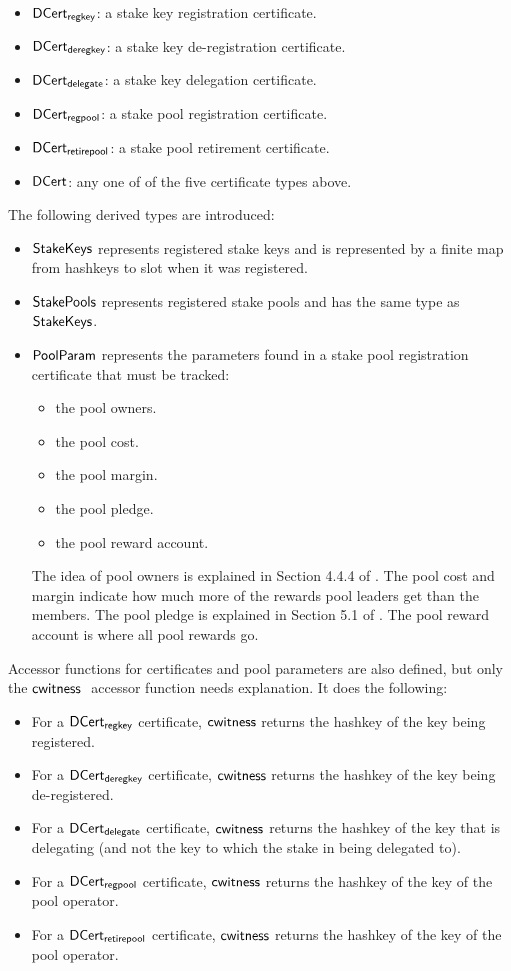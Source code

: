 \begin{itemize}
\item $\mathsf{DCert_{regkey}}$: a stake key registration certificate.
\item $\mathsf{DCert_{deregkey}}$: a stake key de-registration certificate.
\item $\mathsf{DCert_{delegate}}$: a stake key delegation certificate.
\item $\mathsf{DCert_{regpool}}$: a stake pool registration certificate.
\item $\mathsf{DCert_{retirepool}}$: a stake pool retirement certificate.
\item $\mathsf{DCert}$: any one of of the five certificate types above.
\end{itemize}
The following derived types are introduced:
\begin{itemize}
  \item $\mathsf{StakeKeys}$ represents registered stake keys and is represented by a finite
    map from hashkeys to slot when it was registered.
  \item$\mathsf{StakePools}$ represents registered stake pools and has the same type as
    $\mathsf{StakeKeys}$.
\item $\mathsf{PoolParam}$ represents the parameters found in a stake pool registration certificate
  that must be tracked:
  \begin{itemize}
    \item the pool owners.
    \item the pool cost.
    \item the pool margin.
    \item the pool pledge.
    \item the pool reward account.
  \end{itemize}
  The idea of pool owners is explained in Section 4.4.4 of \cite{delegation_design}.
  The pool cost and margin indicate how much more of the rewards pool leaders
  get than the members.
  The pool pledge is explained in Section 5.1 of \cite{delegation_design}.
  The pool reward account is where all pool rewards go.
\end{itemize}

Accessor functions for certificates and pool parameters are also defined, but
only the $\mathsf{cwitness}~ \mathit{}$ accessor function needs explanation.
It does the following:
\begin{itemize}
  \item For a $\mathsf{DCert_{regkey}}$ certificate, $\mathsf{cwitness}$ returns the hashkey
  of the key being registered.
\item For a $\mathsf{DCert_{deregkey}}$ certificate, $\mathsf{cwitness}$ returns the hashkey
  of the key being de-registered.
\item For a $\mathsf{DCert_{delegate}}$ certificate, $\mathsf{cwitness}$ returns the hashkey
  of the key that is delegating (and not the key to which the stake in being delegated to).
\item For a $\mathsf{DCert_{regpool}}$ certificate, $\mathsf{cwitness}$ returns the hashkey
  of the key of the pool operator.
\item For a $\mathsf{DCert_{retirepool}}$ certificate, $\mathsf{cwitness}$ returns the hashkey
  of the key of the pool operator.
\end{itemize}


